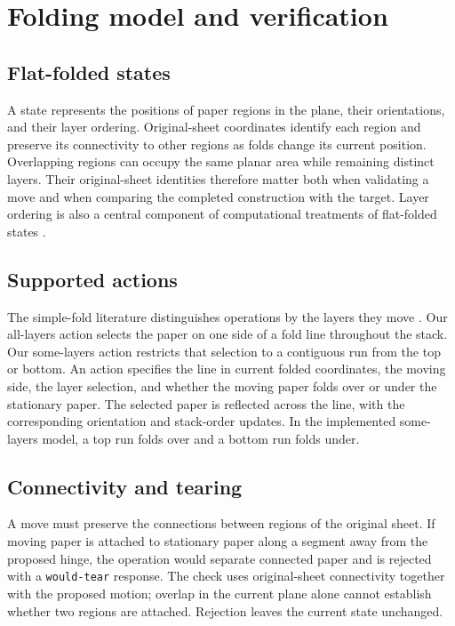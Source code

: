 \section{Folding model and verification}
\label{app:folding-model}

\subsection{Flat-folded states}
\label{sec:problem-states}

A state represents the positions of paper regions in the plane, their orientations, and their
layer ordering. Original-sheet coordinates identify each region and preserve its connectivity to
other regions as folds change its current position. Overlapping regions can occupy the same
planar area while remaining distinct layers. Their original-sheet identities therefore matter
both when validating a move and when comparing the completed construction with the target.
Layer ordering is also a central component of computational treatments of flat-folded states
\citep{akitaya-flatfolder}.

\subsection{Supported actions}
\label{sec:problem-actions}

The simple-fold literature distinguishes operations by the layers they move
\citep{arkin-map}. Our all-layers action selects the paper on one side of a fold line throughout
the stack. Our some-layers action restricts that selection to a contiguous run from the top or
bottom. An action specifies the line in current folded coordinates, the moving side, the layer
selection, and whether the moving paper folds over or under the stationary paper. The selected
paper is reflected across the line, with the corresponding orientation and stack-order updates.
In the implemented some-layers model, a top run folds over and a bottom run folds under.

\subsection{Connectivity and tearing}
\label{app:tearing}

A move must preserve the connections between regions of the original sheet. If moving paper is
attached to stationary paper along a segment away from the proposed hinge, the operation would
separate connected paper and is rejected with a \texttt{would-tear} response. The check uses
original-sheet connectivity together with the proposed motion; overlap in the current plane alone
cannot establish whether two regions are attached. Rejection leaves the current state unchanged.

